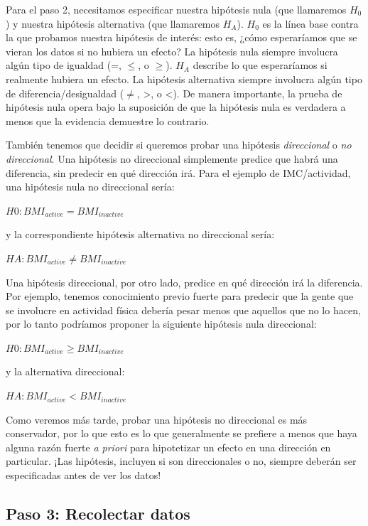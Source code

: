 \documentclass[
  12pt,
]{book}
\theoremstyle{definition}
\theoremstyle{definition}
\theoremstyle{definition}
\theoremstyle{remark}
\begin{document}
Para el paso 2, necesitamos especificar nuestra hipótesis nula (que llamaremos \(H_0\)) y nuestra hipótesis alternativa (que llamaremos \(H_A\)). \(H_0\) es la línea base contra la que probamos nuestra hipótesis de interés: esto es, ¿cómo esperaríamos que se vieran los datos si no hubiera un efecto? La hipótesis nula siempre involucra algún tipo de igualdad (=, \(\le\), o \(\ge\)). \(H_A\) describe lo que esperaríamos si realmente hubiera un efecto. La hipótesis alternativa siempre involucra algún tipo de diferencia/desigualdad (\(\ne\), \textgreater, o \textless). De manera importante, la prueba de hipótesis nula opera bajo la suposición de que la hipótesis nula es verdadera a menos que la evidencia demuestre lo contrario.

También tenemos que decidir si queremos probar una hipótesis \emph{direccional} o \emph{no direccional}. Una hipótesis no direccional simplemente predice que habrá una diferencia, sin predecir en qué dirección irá. Para el ejemplo de IMC/actividad, una hipótesis nula no direccional sería:

\(H0: BMI_{active} = BMI_{inactive}\)

y la correspondiente hipótesis alternativa no direccional sería:

\(HA: BMI_{active} \neq BMI_{inactive}\)

Una hipótesis direccional, por otro lado, predice en qué dirección irá la diferencia. Por ejemplo, tenemos conocimiento previo fuerte para predecir que la gente que se involucre en actividad física debería pesar menos que aquellos que no lo hacen, por lo tanto podríamos proponer la siguiente hipótesis nula direccional:

\(H0: BMI_{active} \ge BMI_{inactive}\)

y la alternativa direccional:

\(HA: BMI_{active} < BMI_{inactive}\)

Como veremos más tarde, probar una hipótesis no direccional es más conservador, por lo que esto es lo que generalmente se prefiere a menos que haya alguna razón fuerte \emph{a priori} para hipotetizar un efecto en una dirección en particular. ¡Las hipótesis, incluyen si son direccionales o no, siempre deberán ser especificadas antes de ver los datos!

\hypertarget{paso-3-recolectar-datos}{%
\subsection{Paso 3: Recolectar datos}\label{paso-3-recolectar-datos}}
\end{document}
